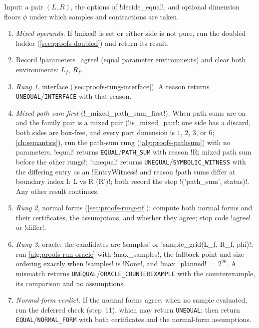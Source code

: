 \begin{algorithm}\label{alg:proofs-decide}
Input: a pair $(L,R)$, the options of \py!decide_equal!, and optional dimension floors $\phi$ under which samples and contractions are taken.
\begin{enumerate}
\item \emph{Mixed operands.} If \py!mixed! is set or either side is not pure, run the doubled ladder (\cref{sec:proofs-doubled}) and return its result.
\item Record \py!parameters_agree! (equal parameter environments) and clear both environments: $L_f$, $R_f$.
\item \emph{Rung 1}, interface (\cref{sec:proofs-rung-interface}). A reason returns \texttt{UNEQUAL}/\allowbreak\texttt{INTERFACE} with that reason.
\item \emph{Mixed path sum first} (\py!_mixed_path_sum_first!). When path sums are on and the family pair is a mixed pair (\py!is_mixed_pair!: one side has a discard, both sides are box-free, and every port dimension is $1$, $2$, $3$, or $6$; \cref{ch:semantics}), run the path-sum rung (\cref{alg:proofs-pathsum}) with no parameters. \code!equal! returns \texttt{EQUAL}/\allowbreak\texttt{PATH\_SUM} with reason \code!R; mixed path sum before the other rungs!; \code!unequal! returns \texttt{UNEQUAL}/\allowbreak\texttt{SYMBOLIC\_WITNESS} with the differing entry as an \py!EntryWitness! and reason \code!path sums differ at boundary index I: L vs R (R')!; both record the stop \code!('path_sum', status)!. Any other result continues.
\item \emph{Rung 2}, normal forms (\cref{sec:proofs-rung-nf}): compute both normal forms and their certificates, the assumptions, and whether they agree; stop code \code!agree! or \code!differ!.
\item \emph{Rung 3}, oracle: the candidates are \py!samples! or \py!sample_grid(L_f, R_f, phi)!; run \cref{alg:proofs-run-oracle} with \py!max_samples!, the fallback point and size ordering exactly when \py!samples! is \py!None!, and \py!max_planned! $=2^{20}$. A mismatch returns \texttt{UNEQUAL}/\allowbreak\texttt{ORACLE\_COUNTEREXAMPLE} with the counterexample, its comparison and no assumptions.
\item \emph{Normal-form verdict.} If the normal forms agree: when no sample evaluated, run the deferred check (step~11), which may return \texttt{UNEQUAL}; then return \texttt{EQUAL}/\allowbreak\texttt{NORMAL\_FORM} with both certificates and the normal-form assumptions.

\end{enumerate}
\end{algorithm}

